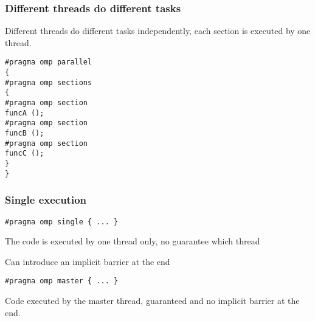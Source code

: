 \documentclass{beamer}
\begin{document}
\begin{frame}
\frametitle{Different threads do different tasks}

\begin{block}{}

Different threads do different tasks independently, each section is executed by one thread.













\begin{verbatim}
#pragma omp parallel
{
#pragma omp sections
{
#pragma omp section
funcA ();
#pragma omp section
funcB ();
#pragma omp section
funcC ();
}
}

\end{verbatim}


\end{block}
\end{frame}

\begin{frame}
\frametitle{Single execution}

\begin{block}{}


\begin{verbatim}
#pragma omp single { ... }

\end{verbatim}

The code is executed by one thread only, no guarantee which thread

Can introduce an implicit barrier at the end


\begin{verbatim}
#pragma omp master { ... }

\end{verbatim}

Code executed by the master thread, guaranteed and no implicit barrier at the end.
\end{block}
\end{frame}
\end{document}
